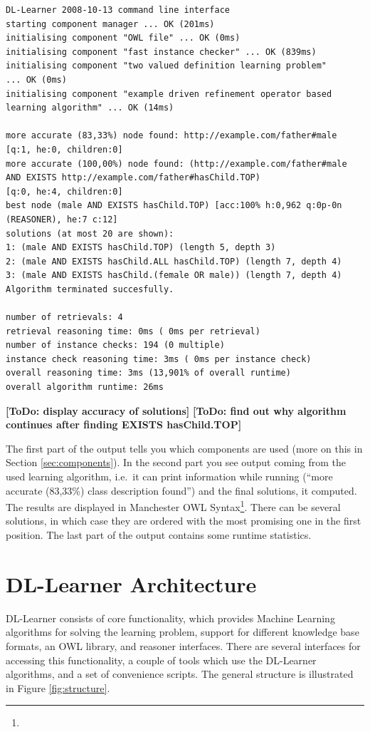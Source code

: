 \documentclass[a4paper,12pt]{scrartcl}
\newcommand{\todo}[1]{\textbf{[ToDo: #1]}}
\begin{document}
\begin{verbatim}
DL-Learner 2008-10-13 command line interface
starting component manager ... OK (201ms)
initialising component "OWL file" ... OK (0ms)
initialising component "fast instance checker" ... OK (839ms)
initialising component "two valued definition learning problem" 
... OK (0ms)
initialising component "example driven refinement operator based 
learning algorithm" ... OK (14ms)

more accurate (83,33%) node found: http://example.com/father#male 
[q:1, he:0, children:0]
more accurate (100,00%) node found: (http://example.com/father#male 
AND EXISTS http://example.com/father#hasChild.TOP) 
[q:0, he:4, children:0]
best node (male AND EXISTS hasChild.TOP) [acc:100% h:0,962 q:0p-0n 
(REASONER), he:7 c:12]
solutions (at most 20 are shown):
1: (male AND EXISTS hasChild.TOP) (length 5, depth 3)
2: (male AND EXISTS hasChild.ALL hasChild.TOP) (length 7, depth 4)
3: (male AND EXISTS hasChild.(female OR male)) (length 7, depth 4)
Algorithm terminated succesfully.

number of retrievals: 4
retrieval reasoning time: 0ms ( 0ms per retrieval)
number of instance checks: 194 (0 multiple)
instance check reasoning time: 3ms ( 0ms per instance check)
overall reasoning time: 3ms (13,901% of overall runtime)
overall algorithm runtime: 26ms
\end{verbatim}

\todo{display accuracy of solutions}
\todo{find out why algorithm continues after finding EXISTS hasChild.TOP}

The first part of the output tells you which components are used (more on this in Section \ref{sec:components}). In the second part you see output coming from the used learning algorithm, i.e.~it can print information while running (``more accurate (83,33\%) class description found'') and the final solutions, it computed. The results are displayed in Manchester OWL Syntax\footnote{\mos}. There can be several solutions, in which case they are ordered with the most promising one in the first position. The last part of the output contains some runtime statistics.

\section{DL-Learner Architecture}

DL-Learner consists of core functionality, which provides Machine Learning algorithms for solving the learning problem, support for different knowledge base formats, an OWL library, and reasoner interfaces. There are several interfaces for accessing this functionality, a couple of tools which use the DL-Learner algorithms, and a set of convenience scripts. The general structure is illustrated in Figure \ref{fig:structure}.
\end{document}
